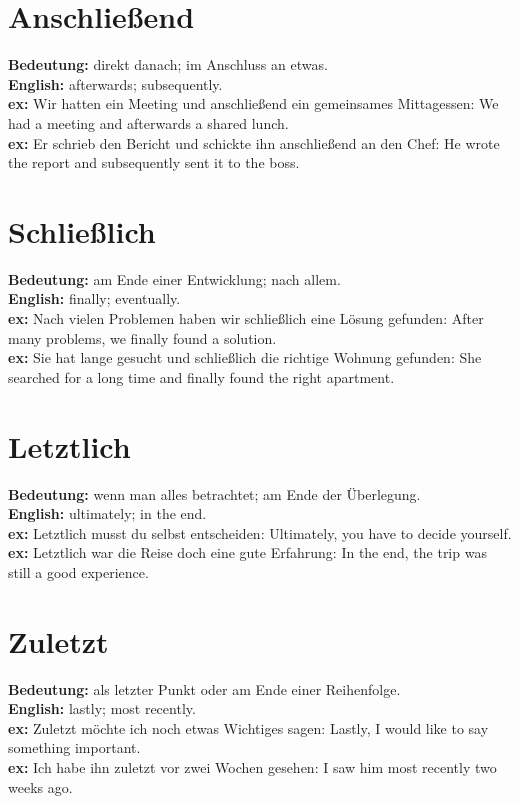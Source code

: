 \documentclass[a4paper]{article}
\begin{document}
    
    \section{Anschließend}
        \textbf{Bedeutung:} direkt danach; im Anschluss an etwas.\\
        \textbf{English:} afterwards; subsequently.\\
        \textbf{ex:} Wir hatten ein Meeting und anschließend ein gemeinsames Mittagessen: We had a meeting and afterwards a shared lunch.\\
        \textbf{ex:} Er schrieb den Bericht und schickte ihn anschließend an den Chef: He wrote the report and subsequently sent it to the boss.
    
    
    \section{Schließlich}
        \textbf{Bedeutung:} am Ende einer Entwicklung; nach allem.\\
        \textbf{English:} finally; eventually.\\
        \textbf{ex:} Nach vielen Problemen haben wir schließlich eine Lösung gefunden: After many problems, we finally found a solution.\\
        \textbf{ex:} Sie hat lange gesucht und schließlich die richtige Wohnung gefunden: She searched for a long time and finally found the right apartment.
    
    
    \section{Letztlich}
        \textbf{Bedeutung:} wenn man alles betrachtet; am Ende der Überlegung.\\
        \textbf{English:} ultimately; in the end.\\
        \textbf{ex:} Letztlich musst du selbst entscheiden: Ultimately, you have to decide yourself.\\
        \textbf{ex:} Letztlich war die Reise doch eine gute Erfahrung: In the end, the trip was still a good experience.
    
    
    \section{Zuletzt}
        \textbf{Bedeutung:} als letzter Punkt oder am Ende einer Reihenfolge.\\
        \textbf{English:} lastly; most recently.\\
        \textbf{ex:} Zuletzt möchte ich noch etwas Wichtiges sagen: Lastly, I would like to say something important.\\
        \textbf{ex:} Ich habe ihn zuletzt vor zwei Wochen gesehen: I saw him most recently two weeks ago.
    
\end{document}
